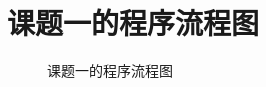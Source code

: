 \documentclass[UTF8,titlepage]{ctexart}
\numberwithin{figure}{section}
\begin{document}
\section{课题一的程序流程图}
\begin{figure}[H]
\centering
 \caption{课题一的程序流程图}
 \label{}
\end{figure}
\clearpage
\end{document}
